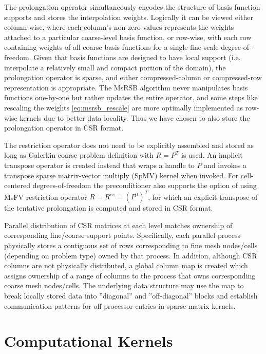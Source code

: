 The prolongation operator simultaneously encodes the structure of basis function supports and stores the interpolation weights.   Logically it can be viewed either column-wise, where each column's non-zero values represents the weights attached to a particular coarse-level basis function, or row-wise, with each row containing weights of all coarse basis functions for a single fine-scale degree-of-freedom.   Given that basis functions are designed to have local support (i.e. interpolate a relatively small and compact portion of the domain), the prolongation operator is sparse, and either compressed-column or compressed-row representation is appropriate.   The MsRSB algorithm never manipulates basis functions one-by-one but rather updates the entire operator, and some steps like rescaling the weights \cref{eq:msrsb_rescale} are more optimally implemented as row-wise kernels due to better data locality.   Thus we have chosen to also store the prolongation operator in CSR format.

The restriction operator does not need to be explicitly assembled and stored as long as Galerkin coarse problem definition with $R = P^T$ is used.   An implicit transpose operator is created instead that wraps a handle to $P$ and invokes a transpose sparse matrix-vector multiply (SpMV) kernel when invoked.   For cell-centered degrees-of-freedom the preconditioner also supports the option of using MsFV restriction operator $R = R^{cv} = (P^0)^T$, for which an explicit transpose of the tentative prolongation is computed and stored in CSR format.

Parallel distribution of CSR matrices at each level matches ownership of corresponding fine/coarse support points.   Specifically, each parallel process physically stores a contiguous set of rows corresponding to fine mesh nodes/cells (depending on problem type) owned by that process.   In addition, although CSR columns are not physically distributed, a global column map is created which assigns ownership of a range of columns to the process that owns corresponding coarse mesh nodes/cells.   The underlying data structure may use the map to break locally stored data into ''diagonal'' and ''off-diagonal'' blocks and establish communication patterns for off-processor entries in sparse matrix kernels.

\section{Computational Kernels}
\label{sec:par_kernels}

